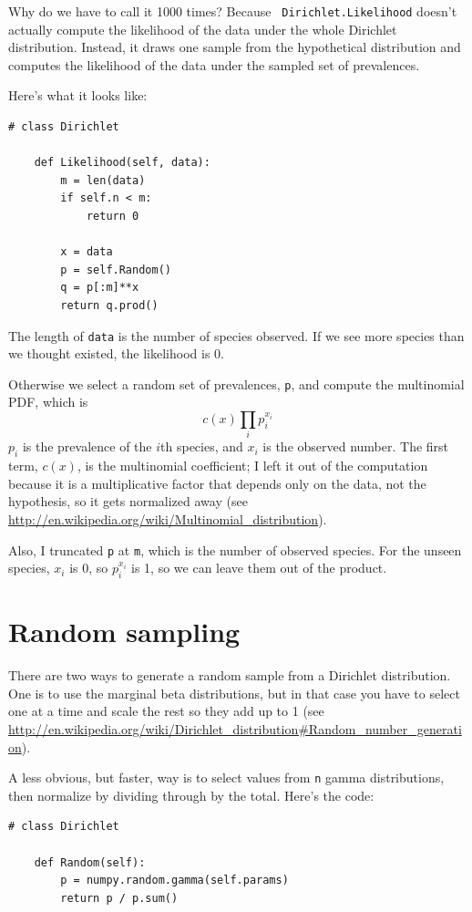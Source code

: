 \documentclass[12pt]{book}
\begin{document}
Why do we have to call it 1000 times?  Because {\tt
  Dirichlet.Likelihood} doesn't actually compute the likelihood of the
data under the whole Dirichlet distribution.  Instead, it draws one
sample from the hypothetical distribution and computes the likelihood
of the data under the sampled set of prevalences.

Here's what it looks like:

\begin{verbatim}
# class Dirichlet

    def Likelihood(self, data):
        m = len(data)
        if self.n < m:
            return 0

        x = data
        p = self.Random()
        q = p[:m]**x
        return q.prod()
\end{verbatim}

The length of {\tt data} is the number of species observed.  If
we see more species than we thought existed, the likelihood is 0.

Otherwise we select a random set of prevalences, {\tt p}, and
compute the multinomial PDF, which is
%
\[ c(x) \prod_i p_i^{x_i}\]
%
$p_i$ is the prevalence of the $i$th species, and $x_i$ is the
observed number.  The first term, $c(x)$, is the multinomial
coefficient; I left it out of the computation because it is
a multiplicative factor that depends only
on the data, not the hypothesis, so it gets normalized away
(see \url{http://en.wikipedia.org/wiki/Multinomial_distribution}).

Also, I truncated {\tt p} at {\tt m}, which is the number of
observed species.  For the unseen species, $x_i$ is 0, so
$p_i^{x_i}$ is 1, so we can leave them out of the product.


\section{Random sampling}

There are two ways to generate a random sample from a Dirichlet
distribution.  One is to use the marginal beta distributions, but in
that case you have to select one at a time and scale the rest so they
add up to 1 (see
\url{http://en.wikipedia.org/wiki/Dirichlet_distribution#Random_number_generation}).

A less obvious, but faster, way is to select values from {\tt n} gamma
distributions, then normalize by dividing through by the total. 
Here's the code:

\begin{verbatim}
# class Dirichlet

    def Random(self):
        p = numpy.random.gamma(self.params)
        return p / p.sum()
\end{verbatim}
\end{document}
